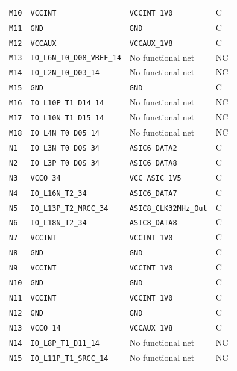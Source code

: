 \documentclass[10pt,a4paper]{article}
\begin{document}
\begin{longtable}{@{}P{15mm}P{42mm}P{92mm}P{10mm}@{}}
\nolinkurl{M10} & \nolinkurl{VCCINT} & \nolinkurl{VCCINT_1V0} & C \\
\nolinkurl{M11} & \nolinkurl{GND} & \nolinkurl{GND} & C \\
\nolinkurl{M12} & \nolinkurl{VCCAUX} & \nolinkurl{VCCAUX_1V8} & C \\
\nolinkurl{M13} & \nolinkurl{IO_L6N_T0_D08_VREF_14} & No functional net & NC \\
\nolinkurl{M14} & \nolinkurl{IO_L2N_T0_D03_14} & No functional net & NC \\
\nolinkurl{M15} & \nolinkurl{GND} & \nolinkurl{GND} & C \\
\nolinkurl{M16} & \nolinkurl{IO_L10P_T1_D14_14} & No functional net & NC \\
\nolinkurl{M17} & \nolinkurl{IO_L10N_T1_D15_14} & No functional net & NC \\
\nolinkurl{M18} & \nolinkurl{IO_L4N_T0_D05_14} & No functional net & NC \\
\nolinkurl{N1} & \nolinkurl{IO_L3N_T0_DQS_34} & \nolinkurl{ASIC6_DATA2} & C \\
\nolinkurl{N2} & \nolinkurl{IO_L3P_T0_DQS_34} & \nolinkurl{ASIC6_DATA8} & C \\
\nolinkurl{N3} & \nolinkurl{VCCO_34} & \nolinkurl{VCC_ASIC_1V5} & C \\
\nolinkurl{N4} & \nolinkurl{IO_L16N_T2_34} & \nolinkurl{ASIC6_DATA7} & C \\
\nolinkurl{N5} & \nolinkurl{IO_L13P_T2_MRCC_34} & \nolinkurl{ASIC8_CLK32MHz_Out} & C \\
\nolinkurl{N6} & \nolinkurl{IO_L18N_T2_34} & \nolinkurl{ASIC8_DATA8} & C \\
\nolinkurl{N7} & \nolinkurl{VCCINT} & \nolinkurl{VCCINT_1V0} & C \\
\nolinkurl{N8} & \nolinkurl{GND} & \nolinkurl{GND} & C \\
\nolinkurl{N9} & \nolinkurl{VCCINT} & \nolinkurl{VCCINT_1V0} & C \\
\nolinkurl{N10} & \nolinkurl{GND} & \nolinkurl{GND} & C \\
\nolinkurl{N11} & \nolinkurl{VCCINT} & \nolinkurl{VCCINT_1V0} & C \\
\nolinkurl{N12} & \nolinkurl{GND} & \nolinkurl{GND} & C \\
\nolinkurl{N13} & \nolinkurl{VCCO_14} & \nolinkurl{VCCAUX_1V8} & C \\
\nolinkurl{N14} & \nolinkurl{IO_L8P_T1_D11_14} & No functional net & NC \\
\nolinkurl{N15} & \nolinkurl{IO_L11P_T1_SRCC_14} & No functional net & NC \\

\end{longtable}
\end{document}
